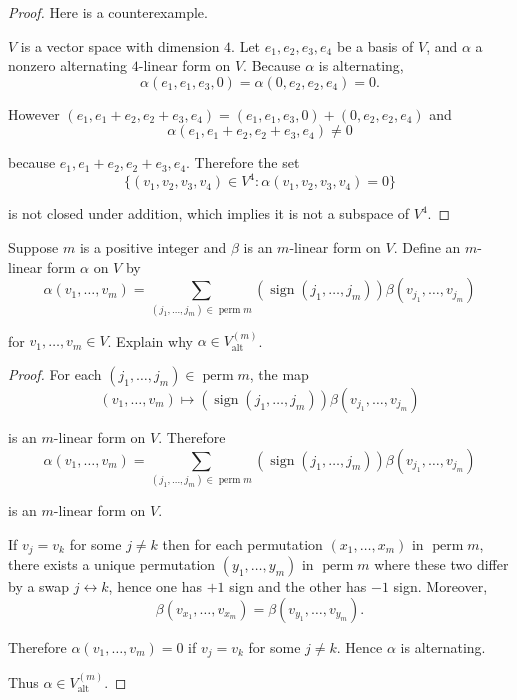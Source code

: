 \begin{proof}
    Here is a counterexample.

    $V$ is a vector space with dimension $4$. Let $e_{1}, e_{2}, e_{3}, e_{4}$ be a basis of $V$, and $\alpha$ a nonzero alternating $4$-linear form on $V$. Because $\alpha$ is alternating,
    \[
        \alpha(e_{1}, e_{1}, e_{3}, 0) = \alpha(0, e_{2}, e_{2}, e_{4}) = 0.
    \]

    However $(e_{1}, e_{1} + e_{2}, e_{2} + e_{3}, e_{4}) = (e_{1}, e_{1}, e_{3}, 0) + (0, e_{2}, e_{2}, e_{4})$ and
    \[
        \alpha(e_{1}, e_{1} + e_{2}, e_{2} + e_{3}, e_{4})\ne 0
    \]

    because $e_{1}, e_{1} + e_{2}, e_{2} + e_{3}, e_{4}$. Therefore the set
    \[
        \{ (v_{1}, v_{2}, v_{3}, v_{4})\in V^{4}: \alpha(v_{1}, v_{2}, v_{3}, v_{4}) = 0 \}
    \]

    is not closed under addition, which implies it is not a subspace of $V^{4}$.
\end{proof}
\newpage

\begin{exercise}\label{chapter9:sectionB:exercise5}
    Suppose $m$ is a positive integer and $\beta$ is an $m$-linear form on $V$. Define an $m$-linear form $\alpha$ on $V$ by
    \[
        \alpha(v_{1}, \ldots, v_{m}) = \sum_{(j_{1}, \ldots, j_{m})\in\operatorname{perm}m}(\operatorname{sign}(j_{1}, \ldots, j_{m}))\beta(v_{j_{1}}, \ldots, v_{j_{m}})
    \]

    for $v_{1}, \ldots, v_{m}\in V$. Explain why $\alpha\in V^{(m)}_{\text{alt}}$.
\end{exercise}

\begin{proof}
    For each $(j_{1}, \ldots, j_{m})\in \operatorname{perm}m$, the map
    \[
        (v_{1}, \ldots, v_{m})\mapsto (\operatorname{sign}(j_{1}, \ldots, j_{m}))\beta(v_{j_{1}}, \ldots, v_{j_{m}})
    \]

    is an $m$-linear form on $V$. Therefore
    \[
        \alpha(v_{1}, \ldots, v_{m}) = \sum_{(j_{1}, \ldots, j_{m})\in\operatorname{perm}m}(\operatorname{sign}(j_{1}, \ldots, j_{m}))\beta(v_{j_{1}}, \ldots, v_{j_{m}})
    \]

    is an $m$-linear form on $V$.

    If $v_{j} = v_{k}$ for some $j\ne k$ then for each permutation $(x_{1}, \ldots, x_{m})$ in $\operatorname{perm}m$, there exists a unique permutation $(y_{1}, \ldots, y_{m})$ in $\operatorname{perm}m$ where these two differ by a swap $j\leftrightarrow k$, hence one has $+1$ sign and the other has $-1$ sign. Moreover,
    \[
        \beta(v_{x_{1}}, \ldots, v_{x_{m}}) = \beta(v_{y_{1}}, \ldots, v_{y_{m}}).
    \]

    Therefore $\alpha(v_{1}, \ldots, v_{m}) = 0$ if $v_{j} = v_{k}$ for some $j\ne k$. Hence $\alpha$ is alternating.

    Thus $\alpha\in V^{(m)}_{\text{alt}}$.
\end{proof}
\newpage

